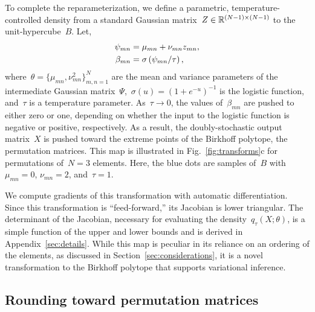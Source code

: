\documentclass[twoside]{article}
\begin{document}
To complete the reparameterization, we define a parametric,
temperature-controlled density from a standard Gaussian
matrix~${Z \in \mathbb{R}^{(N-1) \times (N-1)}}$ to the
unit-hypercube~$B$.  Let,
\begin{align*}
  \psi_{mn} &= \mu_{mn} + \nu_{mn} z_{mn}, \\
   \beta_{mn} &= \sigma\left( \psi_{mn} / \tau \right),
\end{align*}
where~${\theta = \{\mu_{mn}, \nu^2_{mn}\}_{m,n=1}^N}$ are the mean and
variance parameters of the intermediate Gaussian
matrix~$\Psi$,~${\sigma(u) = (1+e^{-u})^{-1}}$ is the logistic
function, and~$\tau$ is a temperature parameter. As~$\tau \to 0$, the
values of~$\beta_{mn}$ are pushed to either zero or one, depending on
whether the input to the logistic function is negative or positive,
respectively.  As a result, the doubly-stochastic output matrix~$X$ is
pushed toward the extreme points of the Birkhoff polytope, the
permutation matrices.  This map is illustrated in
Fig.~\ref{fig:transforms}c for permutations of~${N=3}$ elements.
Here, the blue dots are samples of~$B$ with~$\mu_{mn}=0$,
$\nu_{mn}=2$, and~$\tau=1$.

We compute gradients of this transformation with automatic
differentiation.  Since this transformation is ``feed-forward,'' its
Jacobian is lower triangular. The determinant of the Jacobian,
necessary for evaluating the density~$q_\tau(X; \theta)$, is a simple
function of the upper and lower bounds and is derived in
Appendix~\ref{sec:details}.  While this map is peculiar in its
reliance on an ordering of the elements, as discussed in
Section~\ref{sec:considerations}, it is a novel transformation to the
Birkhoff polytope that supports variational inference.

\subsection{Rounding toward permutation matrices}
\label{sub:rounding}
\end{document}
